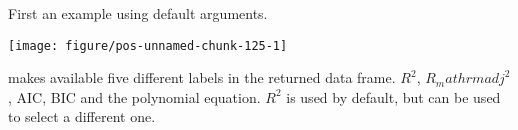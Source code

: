 \documentclass[paper=a4,10pt,div=17,headsepline,BCOR=12mm,twoside,open=right]{scrbook}\usepackage{knitr}
\begin{document}
\begin{knitrout}\footnotesize
{}\color{fgcolor}\begin{kframe}
\begin{alltt}
\hlstd{(}\hlstd{)}
 \hlkwb{<-} \hlopt{:}
 \hlkwb{<-}  \hlopt{+} \hlopt{^} \hlopt{+} \hlopt{^}\hlstd{)} \hlopt{+}
  \hlstd{(}  \hlstd{=} \hlstd{,}  \hlstd{=} \hlopt{^}\hlstd{)} \hlopt{/} \hlstd{)}
 \hlkwb{<-} 
                       \hlstd{=} \hlstd{(}\hlstd{,} \hlstd{),}
                        \hlopt{*} \hlstd{(}\hlstd{,}\hlstd{))}
\end{alltt}
\end{kframe}
\end{knitrout}

First an example using default arguments.

\begin{knitrout}\footnotesize
{}\color{fgcolor}\begin{kframe}
\begin{alltt}
 \hlkwb{<-}  \hlopt{~}  \hlstd{,}  \hlstd{=} \hlstd{)}
  \hlopt{+}
  \hlstd{()} \hlopt{+}
  \hlstd{(} \hlstd{=} \hlstd{,}   \hlopt{+}
  \hlstd{(}   \hlstd{=} \hlstd{)}
\end{alltt}
\end{kframe}

{\centering \texttt{[image: figure/pos-unnamed-chunk-125-1]} 

}



\end{knitrout}

 makes available five different labels in the returned data frame. $R^2$, $R_mathrm{adj}^2$, AIC, BIC and the polynomial equation. $R^2$ is used by default, but  can be used to select a different one.
\end{document}
